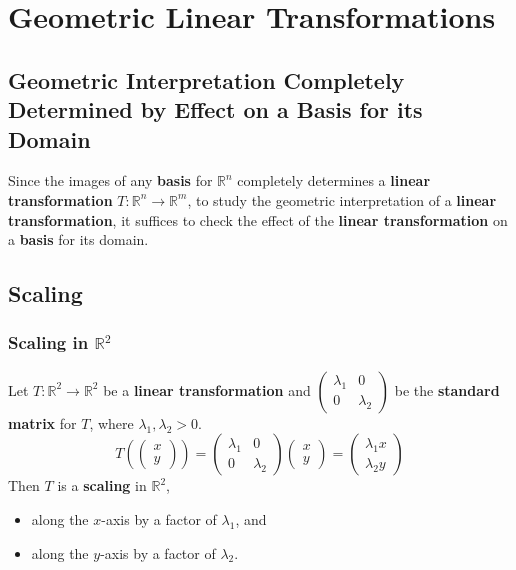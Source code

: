 \documentclass[../ma2001_notes.tex]{subfiles}
\begin{document}
\section{Geometric Linear Transformations}
\subsection{Geometric Interpretation Completely Determined by Effect on a Basis for its Domain}
Since the images of any \textbf{basis} for \(\mathbb{R}^n\) completely determines a \textbf{linear transformation} \(T:\mathbb{R}^n\to\mathbb{R}^m\), to study the geometric interpretation of a \textbf{linear transformation}, it suffices to check the effect of the \textbf{linear transformation} on a \textbf{basis} for its domain.

\subsection{Scaling}
\subsubsection{Scaling in $\mathbb{R}^2$}
Let \(T:\mathbb{R}^2\to\mathbb{R}^2\) be a \textbf{linear transformation} and \(\begin{pmatrix}
	\lambda_1 & 0 \\ 0 & \lambda_2
\end{pmatrix}\) be the \textbf{standard matrix} for \(T\), where \(\lambda_1,\lambda_2>0\).
\[T\left(\begin{pmatrix}
	x \\ y
\end{pmatrix}\right)=\begin{pmatrix}
	\lambda_1 & 0 \\ 0 & \lambda_2
\end{pmatrix}\begin{pmatrix}
	x \\ y
\end{pmatrix}=\begin{pmatrix}
	\lambda_1x \\ \lambda_2y
\end{pmatrix}\]
Then \(T\) is a \textbf{scaling} in \(\mathbb{R}^2\),
\begin{itemize}
	\item along the \(x\)-axis by a factor of \(\lambda_1\), and
	\item along the \(y\)-axis by a factor of \(\lambda_2\).
\end{itemize}
\end{document}
